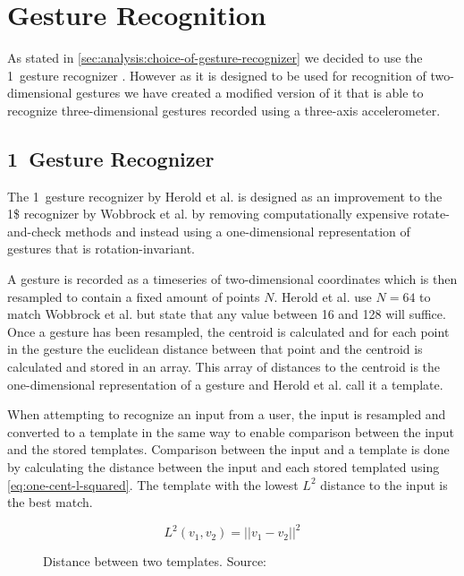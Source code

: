 \section{Gesture Recognition}
\label{sec:design:gesture-recognition}

As stated in \cref{sec:analysis:choice-of-gesture-recognizer} we decided to use the 1\textcent~gesture recognizer \cite{herold20121}.
However as it is designed to be used for recognition of two-dimensional gestures we have created a modified version of it that is able to recognize three-dimensional gestures recorded using a three-axis accelerometer.

\subsection{1\textcent~Gesture Recognizer}
The 1\textcent~gesture recognizer by Herold et al. is designed as an improvement to the 1\$ recognizer \cite{wobbrock2007gestures} by Wobbrock et al. by removing computationally expensive rotate-and-check methods and instead using a one-dimensional representation of gestures that is rotation-invariant.

A gesture is recorded as a timeseries of two-dimensional coordinates which is then resampled to contain a fixed amount of points $N$.
Herold et al. use $N = 64$ to match Wobbrock et al. but state that any value between 16 and 128 will suffice.
Once a gesture has been resampled, the centroid is calculated and for each point in the gesture the euclidean distance between that point and the centroid is calculated and stored in an array.
This array of distances to the centroid is the one-dimensional representation of a gesture and Herold et al. call it a template.

When attempting to recognize an input from a user, the input is resampled and converted to a template in the same way to enable comparison between the input and the stored templates.
Comparison between the input and a template is done by calculating the distance between the input and each stored templated using \cref{eq:one-cent-l-squared}.
The template with the lowest $L^2$ distance to the input is the best match.

\begin{figure}
\begin{equation}
L^{2}(v_1, v_2) = \lvert\lvert v_1 - v_2 \rvert\rvert^2
\label{eq:one-cent-l-squared}
\end{equation}
\caption{Distance between two templates. Source: \cite{herold20121}}
\end{figure}

